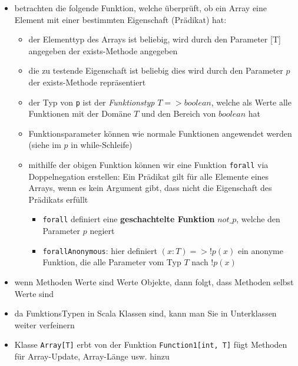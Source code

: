 \begin{itemize}
  \item betrachten die folgende Funktion, welche überprüft, ob ein Array eine
  Element mit einer bestimmten Eigenschaft (Prädikat) hat:
  
  
  
  \begin{itemize}
    \item der Elementtyp des Arrays ist beliebig, wird durch den Parameter [T]
    angegeben der exists-Methode angegeben 
    \item die zu testende Eigenschaft ist beliebig \und dies wird durch
    den Parameter $p$ der exists-Methode repräsentiert
    \item der Typ von \texttt{p} ist der \textit{Funktionstyp} $T => boolean$,
    welche als Werte alle Funktionen mit der Domäne $T$ und den Bereich von
    $boolean$ hat
    \item Funktionsparameter können wie normale Funktionen angewendet werden 
    (siehe im $p$ in while-Schleife)
    \item mithilfe der obigen Funktion können wir eine Funktion \texttt{forall}
  via Doppelnegation erstellen: Ein Prädikat gilt für alle Elemente eines Arrays,
  wenn es kein Argument gibt, dass nicht die Eigenschaft des Prädikats erfüllt
    \begin{itemize}
      \item \texttt{forall} definiert eine \textbf{geschachtelte Funktion} 
      $not\_p$, welche den Parameter $p$ negiert
      \item \texttt{forallAnonymous}: hier definiert $(x: T) => !p(x)$
      ein anonyme Funktion, die alle Parameter vom Typ $T$ nach $!p(x)$
    \end{itemize}
  \end{itemize}
  \item wenn Methoden Werte sind \und Werte Objekte, dann folgt, dass Methoden
  selbst Werte sind
\end{itemize}




\begin{itemize}
  \item da FunktionsTypen in Scala Klassen sind, kann man Sie in Unterklassen
  weiter verfeinern
  \item Klasse \texttt{Array[T]} erbt von der Funktion \texttt{Function1[int, T]}
  \und fügt Methoden für Array-Update, Array-Länge usw. hinzu
  
  
\end{itemize}



